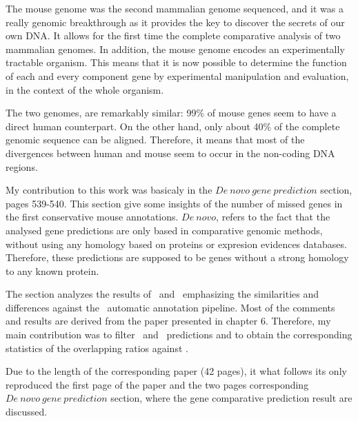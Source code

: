 The mouse genome was the second mammalian genome sequenced, and it was
a really genomic breakthrough as it provides the key to discover the
secrets of our own DNA. It allows for the first time the complete
comparative analysis of two mammalian genomes. In addition, the mouse
genome encodes an experimentally tractable organism. This means that
it is now possible to determine the function of each and every
component gene by experimental manipulation and evaluation, in the
context of the whole organism.

The two genomes, are remarkably similar: 99\% of mouse genes seem to
have a direct human counterpart. On the other hand, only about 40\% of
the complete genomic sequence can be aligned. Therefore, it means that
most of the divergences between human and mouse seem to occur in the
non-coding DNA regions. 

My contribution to this work was basicaly in the $De\ novo\ gene\
prediction$ section, pages 539-540. This section give some insights of
the number of missed genes in the first conservative mouse
annotations. $De\ novo$, refers to the fact that the analysed gene
predictions are only based in comparative genomic methods, without
using any homology based on proteins or expresion evidences
databases. Therefore, these predictions are supposed to be genes
without a strong homology to any known protein.

The section analyzes the results of \sgp\ and \twinscan\ emphasizing
the similarities and differences against the \ensembl\ automatic
annotation pipeline. Most of the comments and results are derived from
the paper presented in chapter 6. Therefore, my main contribution was
to filter \sgp\ and \twinscan\ predictions and to obtain the
corresponding statistics of the overlapping ratios against \ensembl.

Due to the length of the corresponding paper (42 pages), it what
follows its only reproduced the first page of the paper and the two
pages corresponding $De\ novo\ gene\ prediction$ section, where the
gene comparative prediction result are discussed.



\newpage
{}







